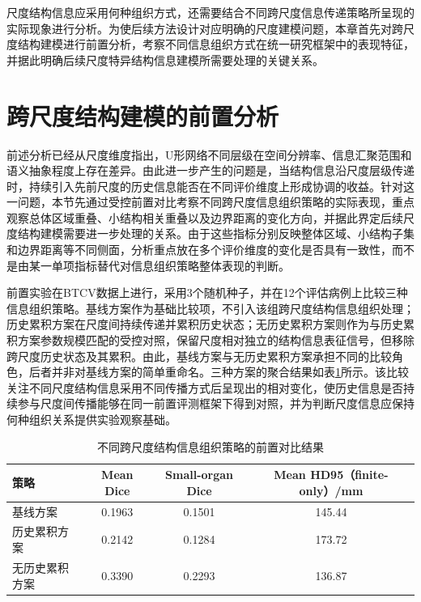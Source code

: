 尺度结构信息应采用何种组织方式，还需要结合不同跨尺度信息传递策略所呈现的实际现象进行分析。为使后续方法设计对应明确的尺度建模问题，本章首先对跨尺度结构建模进行前置分析，考察不同信息组织方式在统一研究框架中的表现特征，并据此明确后续尺度特异结构信息建模所需要处理的关键关系。

\section{跨尺度结构建模的前置分析}

前述分析已经从尺度维度指出，U形网络不同层级在空间分辨率、信息汇聚范围和语义抽象程度上存在差异。由此进一步产生的问题是，当结构信息沿尺度层级传递时，持续引入先前尺度的历史信息能否在不同评价维度上形成协调的收益。针对这一问题，本节先通过受控前置对比考察不同跨尺度信息组织策略的实际表现，重点观察总体区域重叠、小结构相关重叠以及边界距离的变化方向，并据此界定后续尺度结构建模需要进一步处理的关系。由于这些指标分别反映整体区域、小结构子集和边界距离等不同侧面，分析重点放在多个评价维度的变化是否具有一致性，而不是由某一单项指标替代对信息组织策略整体表现的判断。

前置实验在BTCV数据上进行，采用3个随机种子，并在12个评估病例上比较三种信息组织策略。基线方案作为基础比较项，不引入该组跨尺度结构信息组织处理；历史累积方案在尺度间持续传递并累积历史状态；无历史累积方案则作为与历史累积方案参数规模匹配的受控对照，保留尺度相对独立的结构信息表征信号，但移除跨尺度历史状态及其累积。由此，基线方案与无历史累积方案承担不同的比较角色，后者并非对基线方案的简单重命名。三种方案的聚合结果如表\ref{tab:ch4-prestudy-scale-strategy}所示。该比较关注不同尺度结构信息采用不同传播方式后呈现出的相对变化，使历史信息是否持续参与尺度间传播能够在同一前置评测框架下得到对照，并为判断尺度信息应保持何种组织关系提供实验观察基础。

\begin{table}[htbp]
  \centering
  \caption{不同跨尺度结构信息组织策略的前置对比结果}
  \label{tab:ch4-prestudy-scale-strategy}
  \begin{tabular}{lccc}
    \toprule
    策略 & Mean Dice & Small-organ Dice & Mean HD95（finite-only）/mm \\
    \midrule
    基线方案 & 0.1963 & 0.1501 & 145.44 \\
    历史累积方案 & 0.2142 & 0.1284 & 173.72 \\
    无历史累积方案 & 0.3390 & 0.2293 & 136.87 \\
    \bottomrule
  \end{tabular}
\end{table}

